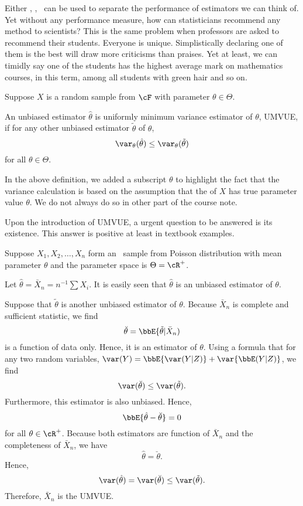 Either \bias, \var, \mse\ can be used to separate the performance
of estimators we can think of. Yet without any performance measure,
how can statisticians recommend any method to scientists?
This is the same problem when professors are asked to
recommend their students. Everyone is unique. Simplistically
declaring one of them is the best will draw more criticisms than
praises. Yet at least, we can timidly say one of the students has
the highest average mark on mathematics courses, in this term,
among all students with green hair and so on.

\begin{defi}
Suppose $X$ is a random sample from $\cF$ with parameter
$\theta \in \Theta$.

An unbiased estimator $\hat \theta$ is uniformly minimum variance
estimator of $\theta$, UMVUE, if for any other unbiased
estimator $\tilde \theta$ of $\theta$,
\[
\var_\theta (\hat \theta) \leq \var_\theta (\tilde \theta)
\]
for all $\theta \in \Theta$.
\end{defi}

In the above definition, we added a subscript $\theta$ to
highlight the fact that the variance calculation is based on
the assumption that the  of $X$ has true parameter
value $\theta$. We do not always do so in other part of the
course note.

Upon the introduction of UMVUE, a urgent question to be
answered is its existence. This answer is positive at least
in textbook examples.

\begin{example}
Suppose $X_1, X_2, \ldots, X_n$ form an \iid\ sample from
Poisson distribution with mean parameter $\theta$
and the parameter space is $\Theta = \cR^+$. 

Let $\hat \theta = \bar X_n = n^{-1} \sum X_i$. It is easily seen that
$\hat \theta$ is an unbiased estimator of $\theta$.

Suppose that $\tilde \theta$ is another unbiased estimator of $\theta$.
Because $\bar X_n$ is complete and sufficient statistic, we find
\[
\breve{\theta} = \bbE\{ \tilde \theta | \bar X_n) 
\]
is a function of data only. Hence, it is an estimator of $\theta$.
Using a formula that for any two random variables,
$\var(Y) = \bbE\{ \var(Y|Z)\} + \var \{ \bbE(Y|Z)\}$,
we find
\[
\var(\breve \theta) \leq \var(\tilde \theta).
\]
Furthermore, this estimator is also unbiased. Hence,
\[
\bbE\{ \hat \theta - \breve{\theta}\} = 0
\]
for all $\theta \in \cR^+$.
Because both estimators are function of $\bar X_n$
and the completeness of $\bar X_n$, we have
\[
\hat \theta = \breve{\theta}.
\]
Hence, 
\[
\var(\hat \theta) = \var(\breve{\theta}) \leq \var(\tilde \theta).
\]
Therefore, $\bar X_n$ is the UMVUE.
\end{example}

